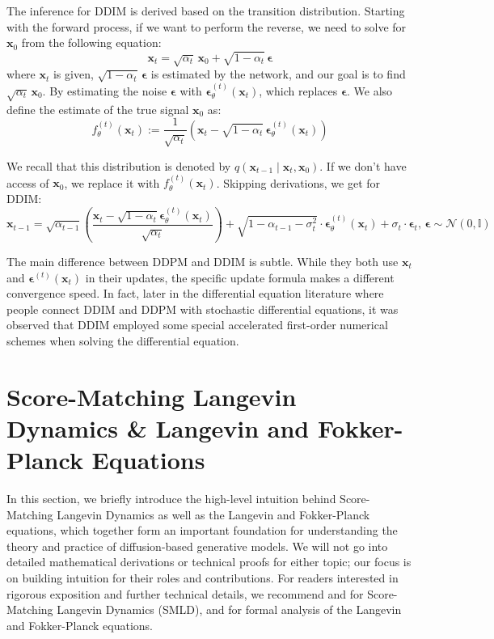 \documentclass{article}
\newcommand{\x}{\mathbf{x}}
\newcommand{\N}{\mathcal{N}}
\newcommand{\eps}{\boldsymbol{\epsilon}}
\begin{document}
	The inference for DDIM is derived based on the transition distribution. Starting with the forward process, if we want to perform the reverse, we need to solve for $\x_0$ from the following equation: $$\x_t = \sqrt{\alpha_t} \, \x_0 + \sqrt{1 - \alpha_t} \, \eps$$
	where $\x_t$ is given, $\sqrt{1 - \alpha_t} \, \eps$ is estimated by the network, and our goal is to find $\sqrt{\alpha_t} \, \x_0$. By estimating the noise $\eps$ with $\eps_\theta^{(t)}(\x_t)$, which replaces $\eps$. We also define the estimate of the true signal $\x_0$ as:
	$$f_\theta^{(t)}(\x_t) := \frac{1}{\sqrt{\alpha_t}} \left( \x_t - \sqrt{1 - \alpha_t} \, \eps_\theta^{(t)}(\x_t) \right)$$
	
	We recall that this distribution is denoted by $q(\x_{t-1} \mid \x_t, \x_0)$. If we don't have access of $\x_0$, we replace it with $f_\theta^{(t)}(\x_t)$. Skipping derivations, we get for DDIM: $$\x_{t-1} = \sqrt{\alpha_{t-1}} \left( \frac{\x_t - \sqrt{1 - \alpha_t} \eps_\theta^{(t)} (\x_t)}{\sqrt{\alpha_t}} \right) + \sqrt{1 - \alpha_{t-1} - \sigma_t^2} \cdot \eps_\theta^{(t)} (\x_t) + \sigma_t \cdot \eps_t, \, \eps \sim \N (0, \mathbb{I})$$
	
	The main difference between DDPM and DDIM is subtle. While they both use $\x_t$ and $\eps^{(t)} (\x_t)$ in their
	updates, the specific update formula makes a different convergence speed. In fact, later in the differential
	equation literature where people connect DDIM and DDPM with stochastic differential equations, it was
	observed that DDIM employed some special accelerated first-order numerical schemes when solving the
	differential equation.
	
	\section{Score-Matching Langevin Dynamics \& Langevin and Fokker-Planck Equations}
	
	In this section, we briefly introduce the high-level intuition behind Score-Matching Langevin Dynamics as well as the Langevin and Fokker-Planck equations, which together form an important foundation for understanding the theory and practice of diffusion-based generative models. We will not go into detailed mathematical derivations or technical proofs for either topic; our focus is on building intuition for their roles and contributions. For readers interested in rigorous exposition and further technical details, we recommend \cite{vincent2011} and \cite{yang2019} for Score-Matching Langevin Dynamics (SMLD), and \cite{risken1989} for formal analysis of the Langevin and Fokker-Planck equations.
	
\end{document}
